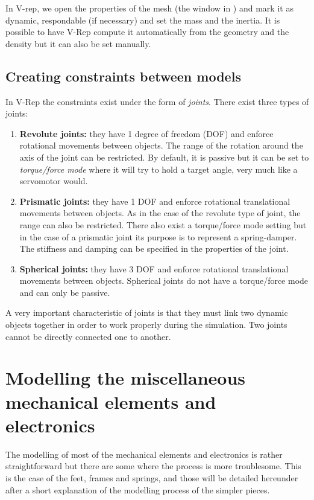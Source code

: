 In V-rep, we open the properties of the mesh (the window in ) and mark it as dynamic, respondable (if necessary) and set the mass and the inertia. It is possible to have V-Rep compute it automatically from the geometry and the density but it can also be set manually.

\subsection{Creating constraints between models \label{sec:joints}}
In V-Rep the constraints exist under the form of \emph{joints}. There exist three types of joints:\begin{enumerate}
\item \textbf{Revolute joints:} they have 1 degree of freedom (DOF) and enforce rotational movements between objects. The range of the rotation around the axis of the joint can be restricted. By default, it is passive but it can be set to \emph{torque/force mode} where it will try to hold a target angle, very much like a servomotor would.
\item \textbf{Prismatic joints:} they have 1 DOF and enforce rotational translational movements between objects. As in the case of the revolute type of joint, the range can also be restricted. There also exist a torque/force mode setting but in the case of a prismatic joint its purpose is to represent a spring-damper. The stiffness and damping can be specified in the properties of the joint.
\item \textbf{Spherical joints:} they have 3 DOF and enforce rotational translational movements between objects. Spherical joints do not have a torque/force mode and can only be passive. 
\end{enumerate}
A very important characteristic of joints is that they must link two dynamic objects together in order to work properly during the simulation. Two joints cannot be directly connected one to another.

\section{Modelling the miscellaneous mechanical elements and electronics}
The modelling of most of the mechanical elements and electronics is rather straightforward but there are some where the process is more troublesome. This is the case of the feet, frames and springs, and those will be detailed hereunder after a short explanation of the modelling process of the simpler pieces.

